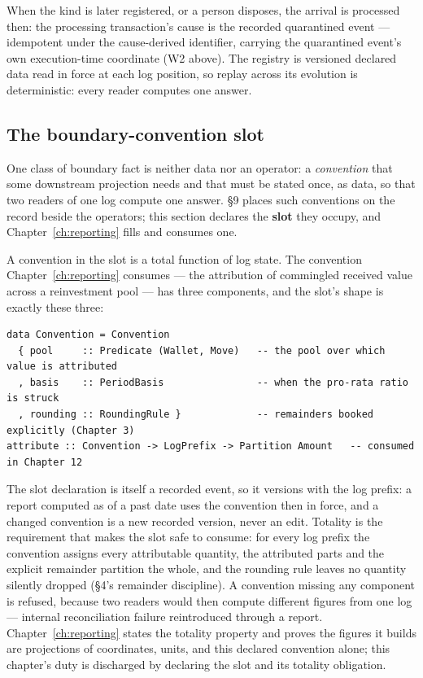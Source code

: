\documentclass[11pt,a4paper]{article}
\begin{document}
When the kind is later registered, or a person disposes, the arrival is processed then: the
processing transaction's cause is the recorded quarantined event --- idempotent under the
cause-derived identifier, carrying the quarantined event's own execution-time coordinate (W2
above). The registry is versioned declared data read in force at each log position, so
replay across its evolution is deterministic: every reader computes one answer.

\subsection{The boundary-convention slot}\label{sec:slot}

One class of boundary fact is neither data nor an operator: a \emph{convention} that
some downstream projection needs and that must be stated once, as data, so that two readers
of one log compute one answer. \S 9 places such conventions on the record beside the
operators; this section declares the \textbf{slot} they occupy, and
Chapter~\ref{ch:reporting} fills and consumes one.

A convention in the slot is a total function of log state. The convention
Chapter~\ref{ch:reporting} consumes --- the attribution of commingled received value across
a reinvestment pool --- has three components, and the slot's shape is exactly these three:

\begin{lstlisting}
data Convention = Convention
  { pool     :: Predicate (Wallet, Move)   -- the pool over which value is attributed
  , basis    :: PeriodBasis                -- when the pro-rata ratio is struck
  , rounding :: RoundingRule }             -- remainders booked explicitly (Chapter 3)
attribute :: Convention -> LogPrefix -> Partition Amount   -- consumed in Chapter 12
\end{lstlisting}

The slot declaration is itself a recorded event, so it versions with the log prefix: a
report computed as of a past date uses the convention then in force, and a changed
convention is a new recorded version, never an edit. Totality is the requirement that makes
the slot safe to consume: for every log prefix the convention assigns every attributable
quantity, the attributed parts and the explicit remainder partition the whole, and the
rounding rule leaves no quantity silently dropped (\S 4's remainder discipline). A
convention missing any component is refused, because two readers would then compute
different figures from one log --- internal reconciliation failure reintroduced through a
report. Chapter~\ref{ch:reporting} states the totality property and proves the figures it
builds are projections of coordinates, units, and this declared convention alone; this
chapter's duty is discharged by declaring the slot and its totality obligation.
\end{document}
